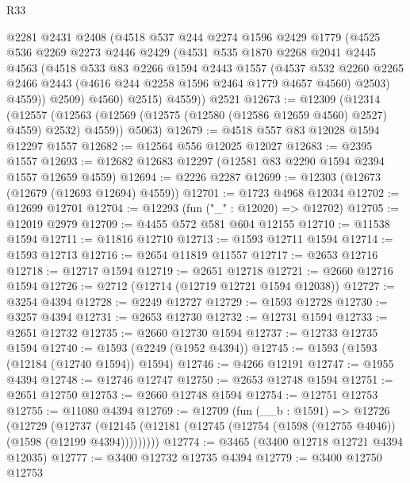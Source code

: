 \begin{lexlean}{R33}
\begin{coremodule}
          @2281
          @2431
          @2408
          (@4518
            @537
            @244
            @2274
            @1596
            @2429
            @1779
            (@4525
              @536
              @2269
              @2273
              @2446
              @2429
              (@4531
                @535
                @1870
                @2268
                @2041
                @2445
                @4563
                (@4518
                  @533
                  @83
                  @2266
                  @1594
                  @2443
                  @1557
                  (@4537
                    @532
                    @2260
                    @2265
                    @2466
                    @2443
                    (@4616 @244 @2258 @1596 @2464 @1779 @4657 @4560)
                    @2503)
                  @4559))
              @2509)
            @4560)
          @2515)
        @4559))
    @2521
@12673 := @12309
    (@12314
      (@12557 (@12563 (@12569 (@12575 (@12580 (@12586 @12659 @4560) @2527) @4559) @2532) @4559))
      @5063)
@12679 := @4518 @557 @83 @12028 @1594 @12297 @1557
@12682 := @12564 @556 @12025 @12027
@12683 := @2395 @1557
@12693 := @12682 @12683 @12297 (@12581 @83 @2290 @1594 @2394 @1557 @12659 @4559)
@12694 := @2226 @2287
@12699 := @12303 (@12673 (@12679 (@12693 @12694) @4559))
@12701 := @1723 @4968 @12034
@12702 := @12699 @12701
@12704 := @12293 (fun ("_" : @12020) => @12702)
@12705 := @12019 @2979
@12709 := @4455 @572 @581 @604 @12155
@12710 := @11538 @1594
@12711 := @11816 @12710
@12713 := @1593 @12711 @1594
@12714 := @1593 @12713
@12716 := @2654 @11819 @11557
@12717 := @2653 @12716
@12718 := @12717 @1594
@12719 := @2651 @12718
@12721 := @2660 @12716 @1594
@12726 := @2712 (@12714 (@12719 @12721 @1594 @12038))
@12727 := @3254 @4394
@12728 := @2249 @12727
@12729 := @1593 @12728
@12730 := @3257 @4394
@12731 := @2653 @12730
@12732 := @12731 @1594
@12733 := @2651 @12732
@12735 := @2660 @12730 @1594
@12737 := @12733 @12735 @1594
@12740 := @1593 (@2249 (@1952 @4394))
@12745 := @1593 (@1593 (@12184 (@12740 @1594)) @1594)
@12746 := @4266 @12191
@12747 := @1955 @4394
@12748 := @12746 @12747
@12750 := @2653 @12748 @1594
@12751 := @2651 @12750
@12753 := @2660 @12748 @1594
@12754 := @12751 @12753
@12755 := @11080 @4394
@12769 := @12709
    (fun (__b : @1591) =>
    @12726
      (@12729
        (@12737 (@12145 (@12181 (@12745 (@12754 (@1598 (@12755 @4046)) (@1598 (@12199 @4394)))))))))
@12774 := @3465 (@3400 @12718 @12721 @4394 @12035)
@12777 := @3400 @12732 @12735 @4394
@12779 := @3400 @12750 @12753

\end{coremodule}
\end{lexlean}
